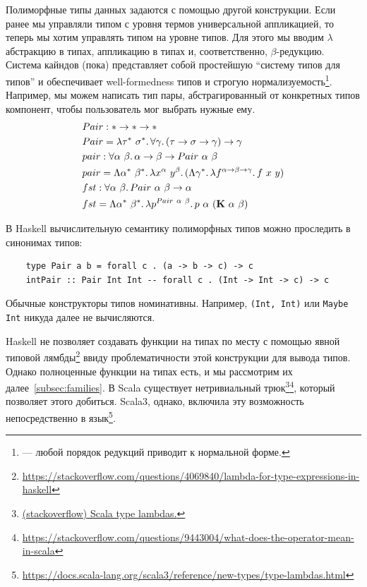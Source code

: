 Полиморфные типы данных задаются с помощью другой конструкции.
Если ранее мы управляли типом с уровня термов универсальной аппликацией, то теперь мы хотим управлять типом на уровне типов.
Для этого мы вводим $\lambda$ абстракцию в типах, аппликацию в типах и, соответственно, $\beta$-редукцию.
Система кайндов (пока) представляет собой простейшую ``систему типов для типов'' и обеспечивает well-formedness типов и строгую нормализуемость\footnote{ --- любой порядок редукций приводит к нормальной форме.}.
Например, мы можем написать тип пары, абстрагированный от конкретных типов компонент, чтобы пользователь мог выбрать нужные ему.
\begin{align*}
    &Pair : * \rightarrow * \rightarrow * \\
    &Pair = \lambda \tau^*~\sigma^*\ldotp\forall \gamma\ldotp(\tau\rightarrow\sigma\rightarrow\gamma)\to\gamma \\
    &pair : \forall \alpha~\beta\ldotp\alpha \rightarrow \beta \rightarrow Pair~\alpha~\beta \\
    &pair = \Lambda \alpha^*~\beta^*\ldotp\lambda x^\alpha~y^\beta\ldotp(\Lambda \gamma^*\ldotp\lambda f^{\alpha\rightarrow\beta\rightarrow\gamma}\ldotp f~x~y) \\
    &fst : \forall \alpha~\beta\ldotp Pair~\alpha~\beta\rightarrow \alpha \\
    &fst = \Lambda \alpha^*~\beta^*\ldotp\lambda p^{Pair~\alpha~\beta}\ldotp p~\alpha~(\mathbf{K}~\alpha~\beta)
\end{align*}

В Haskell вычислительную семантику полиморфных типов можно проследить в синонимах типов:
\begin{verbatim}
    type Pair a b = forall c . (a -> b -> c) -> c
    intPair :: Pair Int Int -- forall c . (Int -> Int -> c) -> c
\end{verbatim}
Обычные конструкторы типов номинативны.
Например, \texttt{(Int, Int)} или \texttt{Maybe Int} никуда далее не вычисляются.

Haskell не позволяет создавать функции на типах по месту с помощью явной типовой лямбды\footnote{\url{https://stackoverflow.com/questions/4069840/lambda-for-type-expressions-in-haskell}} ввиду проблематичности этой конструкции для вывода типов.
Однако полноценные функции на типах есть, и мы рассмотрим их далее~\ref{subsec:families}.
В Scala существует нетривиальный трюк\footnote{\href{https://stackoverflow.com/questions/8736164/what-are-type-lambdas-in-scala-and-what-are-their-benefits}{(stackoverflow) Scala type lambdas.}}\footnote{\url{https://stackoverflow.com/questions/9443004/what-does-the-operator-mean-in-scala}}, который позволяет этого добиться.
Scala3, однако, включила эту возможность непосредственно в язык\footnote{\url{https://docs.scala-lang.org/scala3/reference/new-types/type-lambdas.html}}.

